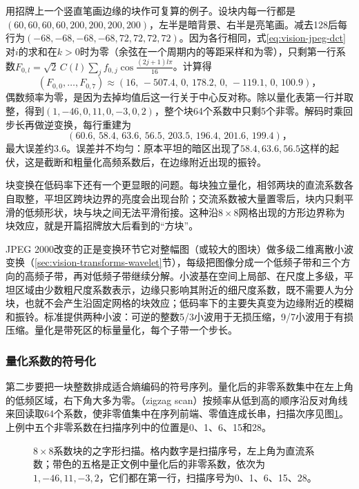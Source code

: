 用招牌上一个竖直笔画边缘的块作可复算的例子。设块内每一行都是$(60,60,60,60,200,200,200,200)$，左半是暗背景、右半是亮笔画。减去128后每行为$(-68,-68,-68,-68,72,72,72,72)$。因为各行相同，式\eqref{eq:vision-jpeg-dct}对$i$的求和在$k>0$时为零（余弦在一个周期内的等距采样和为零），只剩第一行系数$F_{0,l}=\sqrt2\,C(l)\sum_jf_{0,j}\cos\frac{(2j+1)l\pi}{16}$。计算得
\[
 (F_{0,0},\dots,F_{0,7})\approx(16,\,-507.4,\,0,\,178.2,\,0,\,-119.1,\,0,\,100.9)\text{，}
\]
偶数频率为零，是因为去掉均值后这一行关于中心反对称。除以量化表第一行并取整，得到$(1,-46,0,11,0,-3,0,2)$，整个块64个系数中只剩5个非零。解码时乘回步长再做逆变换，每行重建为
\[
 (60.6,\,58.4,\,63.6,\,56.5,\,203.5,\,196.4,\,201.6,\,199.4)\text{，}
\]
最大误差约3.6。误差并不均匀：原本平坦的暗区出现了$58.4,63.6,56.5$这样的起伏，这是截断和粗量化高频系数后，在边缘附近出现的振铃。

块变换在低码率下还有一个更显眼的问题。每块独立量化，相邻两块的直流系数各自取整，平坦区跨块边界的亮度会出现台阶；交流系数被大量置零后，块内只剩平滑的低频形状，块与块之间无法平滑衔接。这种沿$8\times8$网格出现的方形边界称为块效应，就是开篇招牌放大后看到的“方块”。

JPEG 2000改变的正是变换环节它对整幅图（或较大的图块）做多级二维离散小波变换（\ref{sec:vision-transforms-wavelet}节），每级把图像分成一个低频子带和三个方向的高频子带，再对低频子带继续分解。小波基在空间上局部、在尺度上多级，平坦区域由少数粗尺度系数表示，边缘只影响其附近的细尺度系数，既不需要人为分块，也就不会产生沿固定网格的块效应；低码率下的主要失真变为边缘附近的模糊和振铃。标准提供两种小波：可逆的整数5/3小波用于无损压缩，9/7小波用于有损压缩。量化是带死区的标量量化，每个子带一个步长。

\subsubsection{量化系数的符号化}
\label{sec:vision-restoration-symbolization}

第二步要把一块整数排成适合熵编码的符号序列。量化后的非零系数集中在左上角的低频区域，右下角大多为零。（zigzag scan）按频率从低到高的顺序沿反对角线来回读取64个系数，使非零值集中在序列前端、零值连成长串，扫描次序见图\ref{fig:vision-zigzag}。上例中五个非零系数在扫描序列中的位置是0、1、6、15和28。

\begin{figure}[htbp]
 \centering
 
 \caption{$8\times8$系数块的之字形扫描。格内数字是扫描序号，左上角为直流系数；带色的五格是正文例中量化后的非零系数，依次为$1,-46,11,-3,2$，它们都在第一行，扫描序号为0、1、6、15、28。}
 \label{fig:vision-zigzag}
\end{figure}

